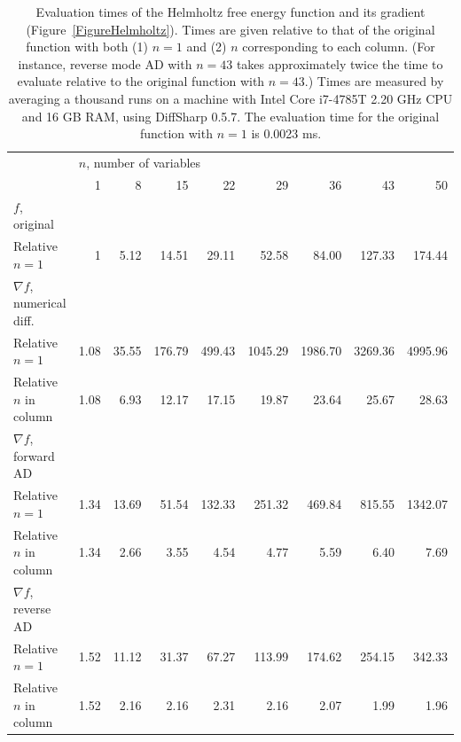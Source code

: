 \documentclass[twoside,11pt]{article}
\begin{document}
\begin{table}
  \centering
  \renewcommand{\arraystretch}{1.2}
  \setlength{\tabcolsep}{1.85mm}
  \caption{Evaluation times of the Helmholtz free energy function and its gradient (Figure~\ref{FigureHelmholtz}). Times are given relative to that of the original function with both (1) $n=1$ and (2) $n$ corresponding to each column. (For instance, reverse mode AD with $n=43$ takes approximately twice the time to evaluate relative to the original function with $n=43$.) Times are measured by averaging a thousand runs on a machine with Intel Core i7-4785T 2.20 GHz CPU and 16 GB RAM, using DiffSharp 0.5.7. The evaluation time for the original function with $n=1$ is 0.0023 ms.}
  \label{TableHelmholtz}
  {\small
  \begin{tabularx}{\columnwidth}{@{}p{42.8mm}rrrrrrrr@{}}
    \toprule
    & \multicolumn{4}{l}{$n$, number of variables}\\
    \cmidrule(l){2-9}
    & 1 & 8 & 15 & 22 & 29 & 36 & 43 & 50 \\
    \midrule
    $f$, original\\
    \hspace{2mm} Relative $n=1$ & 1 & 5.12 & 14.51 & 29.11 & 52.58 & 84.00 & 127.33 & 174.44 \\
    $\nabla f$, numerical diff.\\
    \hspace{2mm} Relative $n=1$ & 1.08 & 35.55 & 176.79 & 499.43 & 1045.29 & 1986.70 & 3269.36 & 4995.96 \\
    \hspace{2mm} Relative $n$ in column & 1.08 & 6.93 & 12.17 & 17.15 & 19.87 & 23.64 & 25.67 & 28.63 \\
    $\nabla f$, forward AD\\
    \hspace{2mm} Relative $n=1$ & 1.34 & 13.69 & 51.54 & 132.33 & 251.32 & 469.84 & 815.55 & 1342.07\\
    \hspace{2mm} Relative $n$ in column & 1.34 & 2.66 & 3.55 & 4.54 & 4.77 & 5.59 & 6.40 & 7.69 \\
    $\nabla f$, reverse AD\\
    \hspace{2mm} Relative $n=1$ & 1.52 & 11.12 & 31.37 & 67.27 & 113.99 & 174.62 & 254.15 & 342.33 \\
    \hspace{2mm} Relative $n$ in column & 1.52 & 2.16 & 2.16 & 2.31 & 2.16 & 2.07 & 1.99 & 1.96 \\
    \bottomrule
  \end{tabularx}}
\end{table}
\end{document}

